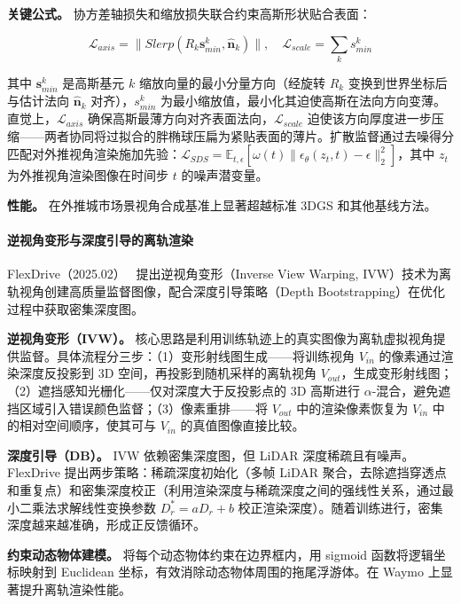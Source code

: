 \textbf{关键公式。} 协方差轴损失和缩放损失联合约束高斯形状贴合表面：

\begin{equation*}
\mathcal{L}_{axis} = \|Slerp(R_k \mathbf{s}_{min}^k, \hat{\mathbf{n}}_k)\|, \quad \mathcal{L}_{scale} = \sum_k s_{min}^k
\end{equation*}

其中 $\mathbf{s}_{min}^k$ 是高斯基元 $k$ 缩放向量的最小分量方向（经旋转 $R_k$ 变换到世界坐标后与估计法向 $\hat{\mathbf{n}}_k$ 对齐），$s_{min}^k$ 为最小缩放值，最小化其迫使高斯在法向方向变薄。直觉上，$\mathcal{L}_{axis}$ 确保高斯最薄方向对齐表面法向，$\mathcal{L}_{scale}$ 迫使该方向厚度进一步压缩——两者协同将过拟合的胖椭球压扁为紧贴表面的薄片。扩散监督通过去噪得分匹配对外推视角渲染施加先验：$\mathcal{L}_{SDS} = \mathbb{E}_{t,\epsilon}[\omega(t) \| \epsilon_\theta(z_t, t) - \epsilon \|_2^2]$，其中 $z_t$ 为外推视角渲染图像在时间步 $t$ 的噪声潜变量。

\textbf{性能。} 在外推城市场景视角合成基准上显著超越标准 3DGS 和其他基线方法。

\paragraph{逆视角变形与深度引导的离轨渲染}

FlexDrive（2025.02）~\cite{2502_21093} 提出逆视角变形（Inverse View Warping, IVW）技术为离轨视角创建高质量监督图像，配合深度引导策略（Depth Bootstrapping）在优化过程中获取密集深度图。

\textbf{逆视角变形（IVW）。} 核心思路是利用训练轨迹上的真实图像为离轨虚拟视角提供监督。具体流程分三步：（1）变形射线图生成——将训练视角 $V_{in}$ 的像素通过渲染深度反投影到 3D 空间，再投影到随机采样的离轨视角 $V_{out}$，生成变形射线图；（2）遮挡感知光栅化——仅对深度大于反投影点的 3D 高斯进行 $\alpha$-混合，避免遮挡区域引入错误颜色监督；（3）像素重排——将 $V_{out}$ 中的渲染像素恢复为 $V_{in}$ 中的相对空间顺序，使其可与 $V_{in}$ 的真值图像直接比较。

\textbf{深度引导（DB）。} IVW 依赖密集深度图，但 LiDAR 深度稀疏且有噪声。FlexDrive 提出两步策略：稀疏深度初始化（多帧 LiDAR 聚合，去除遮挡穿透点和重复点）和密集深度校正（利用渲染深度与稀疏深度之间的强线性关系，通过最小二乘法求解线性变换参数 $D_r^* = a D_r + b$ 校正渲染深度）。随着训练进行，密集深度越来越准确，形成正反馈循环。

\textbf{约束动态物体建模。} 将每个动态物体约束在边界框内，用 sigmoid 函数将逻辑坐标映射到 Euclidean 坐标，有效消除动态物体周围的拖尾浮游体。在 Waymo 上显著提升离轨渲染性能。

